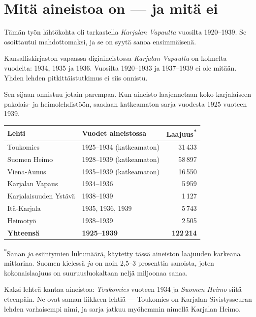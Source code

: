 \documentclass[10pt,a4paper]{article}
\begin{document}
\section{Mitä aineistoa on --- ja mitä ei}

Tämän työn lähtökohta oli tarkastella \emph{Karjalan Vapautta} vuosilta 1920--1939.
Se osoittautui mahdottomaksi, ja se on syytä sanoa ensimmäisenä.

Kansalliskirjaston vapaassa digiaineistossa \emph{Karjalan Vapautta} on kolmelta
vuodelta: 1934, 1935 ja 1936. Vuosilta 1920--1933 ja 1937--1939 ei ole mitään.
Yhden lehden pitkittäistutkimus ei siis onnistu.

Sen sijaan onnistuu jotain parempaa. Kun aineisto laajennetaan koko karjalaiseen
pakolais- ja heimolehdistöön, saadaan katkeamaton sarja vuodesta 1925 vuoteen 1939.

\begin{center}
\begin{tabularx}{\linewidth}{@{}lXr@{}}
\toprule
\textbf{Lehti} & \textbf{Vuodet aineistossa} & \textbf{Laajuus\textsuperscript{*}} \\
\midrule
Toukomies & 1925--1934 (katkeamaton) & 31\,433 \\
Suomen Heimo & 1928--1939 (katkeamaton) & 58\,897 \\
Viena-Aunus & 1935--1939 (katkeamaton) & 16\,550 \\
Karjalan Vapaus & 1934--1936 & 5\,959 \\
Karjalaisuuden Ystävä & 1938--1939 & 1\,127 \\
Itä-Karjala & 1935, 1936, 1939 & 5\,743 \\
Heimotyö & 1938--1939 & 2\,505 \\
\midrule
\textbf{Yhteensä} & \textbf{1925--1939} & \textbf{122\,214} \\
\bottomrule
\end{tabularx}
\end{center}

{\footnotesize \textsuperscript{*}Sanan \emph{ja} esiintymien lukumäärä, käytetty
tässä aineiston laajuuden karkeana mittarina. Suomen kielessä \emph{ja} on noin
2,5--3 prosenttia sanoista, joten kokonaislaajuus on suuruusluokaltaan neljä miljoonaa
sanaa.}

Kaksi lehteä kantaa aineistoa: \emph{Toukomies} vuoteen 1934 ja \emph{Suomen Heimo}
siitä eteenpäin. Ne ovat saman liikkeen lehtiä --- Toukomies on Karjalan
Sivistysseuran lehden varhaisempi nimi, ja sarja jatkuu myöhemmin nimellä Karjalan
Heimo.
\end{document}
